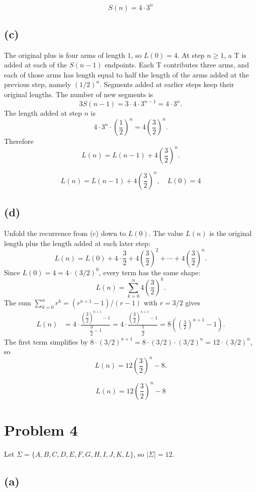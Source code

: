 \documentclass[11pt]{article}
\begin{document}
\[
\boxed{S(n)=4\cdot 3^{n}}
\]

\subsection*{(c)}

The original plus is four arms of length $1$, so $L(0)=4$. At step $n\ge 1$, a T is added at each of the $S(n-1)$ endpoints. Each T contributes three arms, and each of those arms has length equal to half the length of the arms added at the previous step, namely $(1/2)^{n}$. Segments added at earlier steps keep their original lengths. The number of new segments is
\[
3S(n-1)=3\cdot 4\cdot 3^{n-1}=4\cdot 3^{n}.
\]
The length added at step $n$ is
\[
4\cdot 3^{n}\cdot\left(\frac{1}{2}\right)^{n}=4\left(\frac{3}{2}\right)^{n}.
\]
Therefore
\[
L(n)=L(n-1)+4\left(\frac{3}{2}\right)^{n}.
\]

\[
\boxed{L(n)=L(n-1)+4\left(\dfrac{3}{2}\right)^{n},\quad L(0)=4}
\]

\subsection*{(d)}

Unfold the recurrence from (c) down to $L(0)$. The value $L(n)$ is the original length plus the length added at each later step:
\[
L(n)=L(0)+4\cdot\frac{3}{2}+4\left(\frac{3}{2}\right)^{2}+\cdots+4\left(\frac{3}{2}\right)^{n}.
\]
Since $L(0)=4=4\cdot(3/2)^{0}$, every term has the same shape:
\[
L(n)=\sum_{k=0}^{n}4\left(\frac{3}{2}\right)^{k}.
\]
The sum $\sum_{k=0}^{n}r^{k}=(r^{n+1}-1)/(r-1)$ with $r=3/2$ gives
\begin{align*}
L(n)
&=4\cdot\frac{\left(\dfrac{3}{2}\right)^{n+1}-1}{\dfrac{3}{2}-1}
=4\cdot\frac{\left(\dfrac{3}{2}\right)^{n+1}-1}{\dfrac{1}{2}}
=8\left(\left(\frac{3}{2}\right)^{n+1}-1\right).
\end{align*}
The first term simplifies by $8\cdot(3/2)^{n+1}=8\cdot(3/2)\cdot(3/2)^{n}=12\cdot(3/2)^{n}$, so
\[
L(n)=12\left(\frac{3}{2}\right)^{n}-8.
\]

\[
\boxed{L(n)=12\left(\dfrac{3}{2}\right)^{n}-8}
\]

\section*{Problem 4}

Let $\Sigma=\{A,B,C,D,E,F,G,H,I,J,K,L\}$, so $|\Sigma|=12$.

\subsection*{(a)}
\end{document}

